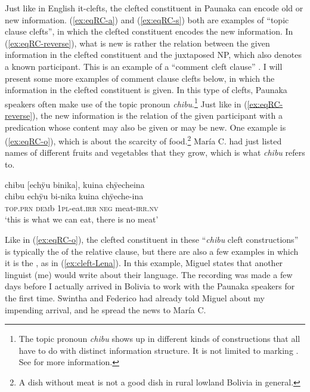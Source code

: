 Just like in English it-clefts, the clefted constituent in Paunaka can encode old or new information. (\ref{ex:eqRC-a}) and (\ref{ex:eqRC-s}) both are examples of “topic clause clefts”, in which the clefted constituent encodes the new information. In (\ref{ex:eqRC-reverse}), what is new is rather the relation between the given information in the clefted constituent and the juxtaposed NP, which also denotes a known participant. This is an example of a “comment cleft clause” \citep[cf.][9]{DelinOberlander2005}. I will present some more examples of comment clause clefts below, in which the information in the clefted constituent is given. In this type of clefts, Paunaka speakers often make use of the topic pronoun \textit{chibu}.\footnote{The topic pronoun \textit{chibu} shows up in different kinds of constructions that all have to do with distinct information structure. It is not limited to marking . See  for more information.} Just like in (\ref{ex:eqRC-reverse}), the new information is the relation of the given participant with a predication whose content may also be given or may be new. One example is (\ref{ex:eqRC-o}), which is about the scarcity of food.\footnote{A dish without meat is not a good dish in rural lowland Bolivia in general.} María C. had just listed names of different fruits and vegetables that they grow, which is what \textit{chibu} refers to.

\ea\label{ex:eqRC-o}
\begingl
\glpreamble chibu \textup{[}echÿu binika\textup{]}, kuina chÿecheina\\
\gla chibu echÿu bi-nika kuina chÿeche-ina\\
\textsc{top.prn} \textsc{dem}b 1\textsc{pl}-eat.\textsc{irr} \textsc{neg} meat-\textsc{irr.nv}\\
\glft ‘this is what we can eat, there is no meat’
\endgl
\trailingcitation{[uxx-p110825l.197]}
\xe


Like in (\ref{ex:eqRC-o}), the clefted constituent in these “\textit{chibu} cleft constructions” is typically the  of the relative clause, but there are also a few examples in which it is the , as in (\ref{ex:cleft-Lena}). In this example, Miguel states that another linguist (me) would write about their language. The recording was made a few days before I actually arrived in Bolivia to work with the Paunaka speakers for the first time. Swintha and Federico had already told Miguel about my impending arrival, and he spread the news to María C.

